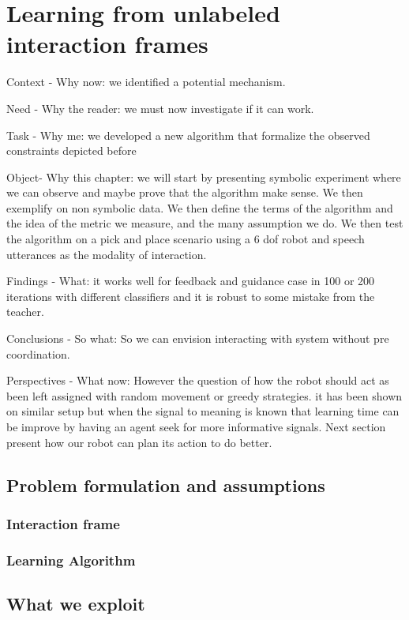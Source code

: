 \chapter{Learning from unlabeled interaction frames}
\minitoc

Context - Why now: we identified a potential mechanism.

Need - Why the reader: we must now investigate if it can work.

Task - Why me: we developed a new algorithm that formalize the observed constraints depicted before

Object- Why this chapter:  we will start by presenting symbolic experiment where we can observe and maybe prove that the algorithm make sense. We then exemplify on non symbolic data. We then define the terms of the algorithm and the idea of the metric we measure, and the many assumption we do. We then test the algorithm on a pick and place scenario using a 6 dof robot and speech utterances as the modality of interaction.

Findings - What: it works well for feedback and guidance case in 100 or 200 iterations with different classifiers and it is robust to some mistake from the teacher.

Conclusions - So what: So we can envision interacting with system without pre coordination. 

Perspectives - What now: However the question of how the robot should act as been left assigned with random movement or greedy strategies. it has been shown on similar setup but when the signal to meaning is known that learning time can be improve by having an agent seek for more informative signals. Next section present how our robot can plan its action to do better.

\section{Problem formulation and assumptions}

\subsection{Interaction frame}

\subsection{Learning Algorithm}

\section{What we exploit}

